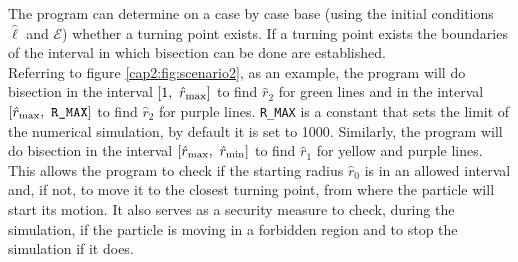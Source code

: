 The program can determine on a case by case base (using the initial conditions
$\hat \ell$ and $\mathcal E$) whether a turning point exists.
If a turning point exists the boundaries of the interval in which bisection can
be done are established. \\
Referring to figure \ref{cap2:fig:scenario2}, as an example, the program will
do bisection in the interval $[1, ~ \hat r_{\rm max}]$ to find $\hat r_2$ for
green lines and in the interval $[\hat r_{\rm max}, ~ \texttt{R\_MAX}]$ to find
$\hat r_2$ for purple lines.
\texttt{R\_MAX} is a constant that sets the limit of the numerical simulation,
by default it is set to 1000.
Similarly, the program will do bisection in the interval
$[\hat r_{\rm max}, ~ \hat r_{\rm min}]$ to find $\hat r_1$ for yellow and
purple lines.
This allows the program to check if the starting radius $ \hat{r}_0 $ is in an
allowed interval and, if not, to move it to the closest turning point, from
where the particle will start its motion.
It also serves as a security measure to check, during the simulation, if the
particle is moving in a forbidden region and to stop the simulation if it does.

